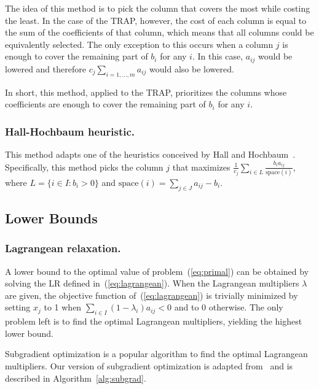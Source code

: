 \documentclass[runningheads]{llncs}
\begin{document}
The idea of this method is to pick the column that covers the most while costing the least. In the case of the TRAP, however, the cost of each column is equal to the sum of the coefficients of that column, which means that all columns could be equivalently selected. The only exception to this occurs when a column $j$ is enough to cover the remaining part of $b_i$ for any $i$. In this case, $a_{ij}$ would be lowered and therefore $c_j \sum_{i=1,\dots,m} a_{ij}$ would also be lowered. 

In short, this method, applied to the TRAP, prioritizes the columns whose coefficients are enough to cover the remaining part of $b_i$ for any $i$. 

\subsubsection{Hall-Hochbaum heuristic.} This method adapts one of the heuristics conceived by Hall and Hochbaum~\cite{hall-hochbaum-1992-multicovering}. Specifically, this method picks the column $j$ that maximizes $\frac{1}{c_j} \sum_{i \in L} \frac{b_i a_{ij}}{\text{space}(i)}$, where $L = \{i \in I : b_i > 0 \}$ and $\text{space}(i) = \sum_{j \in J} a_{ij} - b_i$.

\subsection{Lower Bounds}
\label{subsec:branch-bound:lb}

\subsubsection{Lagrangean relaxation.} A lower bound to the optimal value of problem~(\ref{eq:primal}) can be obtained by solving the LR defined in~(\ref{eq:lagrangean}). When the Lagrangean multipliers $\lambda$ are given, the objective function of~(\ref{eq:lagrangean}) is trivially minimized by setting $x_j$ to 1 when $\sum_{i \in I} (1 - \lambda_i) a_{ij} < 0$ and to 0 otherwise. The only problem left is to find the optimal Lagrangean multipliers, yielding the highest lower bound.

Subgradient optimization is a popular algorithm to find the optimal Lagrangean multipliers. Our version of subgradient optimization is adapted from~\cite{balas-carrera-1996-dynamic} and is described in Algorithm~\ref{alg:subgrad}.
\end{document}
